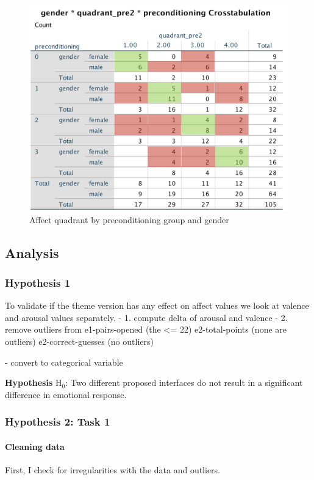 \begin{figure}[h!]
	\centering
	\includegraphics[width=0.7\linewidth]{graphics/preconditioning_success_by_gender}
	\caption{Affect quadrant by preconditioning group and gender}
	\label{fig:preconditioningsuccessbygender}
\end{figure}
	
	\subsection{Analysis}
	
	\subsubsection{Hypothesis 1}
	
	To validate if the theme version has any effect on affect values we look at valence and arousal values separately.
	- 1. compute delta of arousal and valence
	- 2. remove outliers from 
	e1-pairs-opened (the <= 22)
	e2-total-points (none are outliers)
	e2-correct-guesses (no outliers)
	
	- convert to categorical variable 
	
	\textbf{Hypothesis} H$_{0}$: Two different proposed interfaces do not result in a significant difference in emotional response.
	
	\subsubsection{Hypothesis 2: Task 1}
	
		\paragraph{Cleaning data}
		
		First, I check for irregularities with the data and outliers.
		
